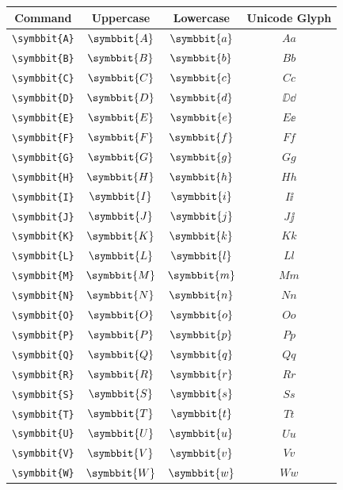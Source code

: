 \documentclass[12pt,a4paper]{article}
\begin{document}
\begin{longtable}{|c|c|c|c|}
\hline
\textbf{Command} & \textbf{Uppercase} & \textbf{Lowercase} & \textbf{Unicode Glyph} \\
\hline
\verb|\symbbit{A}| & $\symbbit{A}$ & $\symbbit{a}$ & $ 𝐴 𝑎 $ \\
\verb|\symbbit{B}| & $\symbbit{B}$ & $\symbbit{b}$ & $ 𝐵 𝑏 $ \\
\verb|\symbbit{C}| & $\symbbit{C}$ & $\symbbit{c}$ & $ 𝐶 𝑐 $ \\
\verb|\symbbit{D}| & $\symbbit{D}$ & $\symbbit{d}$ & $ ⅅ ⅆ $ \\
\verb|\symbbit{E}| & $\symbbit{E}$ & $\symbbit{e}$ & $ 𝐸 ⅇ $ \\
\verb|\symbbit{F}| & $\symbbit{F}$ & $\symbbit{f}$ & $ 𝐹 𝑓 $ \\
\verb|\symbbit{G}| & $\symbbit{G}$ & $\symbbit{g}$ & $ 𝐺 𝑔 $ \\
\verb|\symbbit{H}| & $\symbbit{H}$ & $\symbbit{h}$ & $ 𝐻 ℎ $ \\
\verb|\symbbit{I}| & $\symbbit{I}$ & $\symbbit{i}$ & $ 𝐼 ⅈ $ \\
\verb|\symbbit{J}| & $\symbbit{J}$ & $\symbbit{j}$ & $ 𝐽 ⅉ $ \\
\verb|\symbbit{K}| & $\symbbit{K}$ & $\symbbit{k}$ & $ 𝐾 𝑘 $ \\
\verb|\symbbit{L}| & $\symbbit{L}$ & $\symbbit{l}$ & $ 𝐿 𝑙 $ \\
\verb|\symbbit{M}| & $\symbbit{M}$ & $\symbbit{m}$ & $ 𝑀 𝑚 $ \\
\verb|\symbbit{N}| & $\symbbit{N}$ & $\symbbit{n}$ & $ 𝑁 𝑛 $ \\
\verb|\symbbit{O}| & $\symbbit{O}$ & $\symbbit{o}$ & $ 𝑂 𝑜 $ \\
\verb|\symbbit{P}| & $\symbbit{P}$ & $\symbbit{p}$ & $ 𝑃 𝑝 $ \\
\verb|\symbbit{Q}| & $\symbbit{Q}$ & $\symbbit{q}$ & $ 𝑄 𝑞 $ \\
\verb|\symbbit{R}| & $\symbbit{R}$ & $\symbbit{r}$ & $ 𝑅 𝑟 $ \\
\verb|\symbbit{S}| & $\symbbit{S}$ & $\symbbit{s}$ & $ 𝑆 𝑠 $ \\
\verb|\symbbit{T}| & $\symbbit{T}$ & $\symbbit{t}$ & $ 𝑇 𝑡 $ \\
\verb|\symbbit{U}| & $\symbbit{U}$ & $\symbbit{u}$ & $ 𝑈 𝑢 $ \\
\verb|\symbbit{V}| & $\symbbit{V}$ & $\symbbit{v}$ & $ 𝑉 𝑣 $ \\
\verb|\symbbit{W}| & $\symbbit{W}$ & $\symbbit{w}$ & $ 𝑊 𝑤 $ \\

\end{longtable}
\end{document}
